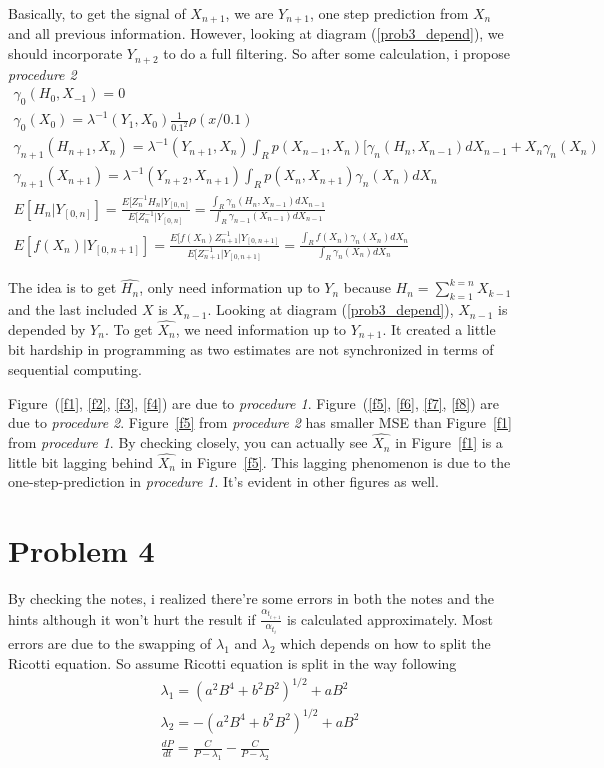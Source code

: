 \documentclass[a4paper,10pt]{article}
\begin{document}
Basically, to get the signal of $X_{n+1}$, we are $Y_{n+1}$, one step prediction from $X_n$ and all previous information. However, looking at diagram (\ref{prob3_depend}), we should incorporate $Y_{n+2}$ to do a full filtering. So after some calculation, i propose \emph{procedure 2}
\begin{eqnarray}
\gamma_0(H_0, X_{-1}) = 0  \\
\gamma_0(X_0) = \lambda^{-1}(Y_{1}, X_{0})\frac{1}{0.1^2}\rho(x/0.1)  \\
\gamma_{n+1}(H_{n+1}, X_{n}) =  \lambda^{-1}(Y_{n+1}, X_{n}) \int_R p(X_{n-1}, X_n)[\gamma_n(H_n, X_{n-1})dX_{n-1} + X_n \gamma_n(X_n)  \\
\gamma_{n+1}(X_{n+1}) = \lambda^{-1}(Y_{n+2}, X_{n+1}) \int_R p(X_n, X_{n+1}) \gamma_n(X_n)dX_n  \\
E[H_n|Y_{[0,n]}] = \frac{E[Z_n^{-1}H_n|Y_{[0,n]}}{E[Z_n^{-1}|Y_{[0,n]}} = \frac{\int_R \gamma_n(H_n, X_{n-1}) dX_{n-1}}{\int_R \gamma_{n-1}(X_{n-1})dX_{n-1}} \\
E[f(X_n) | Y_{[0,n+1]}] = \frac{E[f(X_n)Z_{n+1}^{-1}|Y_{[0,n+1]}}{E[Z_{n+1}^{-1}|Y_{[0,n+1]}} = \frac{\int_R f(X_n)\gamma_n(X_n)dX_n }{\int_R \gamma_n(X_n)dX_n}
\end{eqnarray}

The idea is to get $\hat{H_n}$, only need information up to $Y_n$ because $H_n = \sum_{k=1}^{k=n} X_{k-1}$ and the last included $X$ is $X_{n-1}$. Looking at diagram (\ref{prob3_depend}), $X_{n-1}$ is depended by $Y_n$. To get $\hat{X_n}$, we need information up to $Y_{n+1}$. It created a little bit hardship in programming as two estimates are not synchronized in terms of sequential computing.

Figure~(\ref{f1}, \ref{f2}, \ref{f3}, \ref{f4}) are due to \emph{procedure 1}. Figure~(\ref{f5}, \ref{f6}, \ref{f7}, \ref{f8}) are due to \emph{procedure 2}. Figure~\ref{f5} from \emph{procedure 2} has smaller MSE than Figure~\ref{f1} from \emph{procedure 1}. By checking closely, you can actually see $\hat{X_n}$ in Figure~\ref{f1} is a little bit lagging behind $\hat{X_n}$ in Figure~\ref{f5}. This lagging phenomenon is due to the one-step-prediction in \emph{procedure 1}. It's evident in other figures as well.

\section{Problem 4}
By checking the notes, i realized there're some errors in both the notes and the hints although it won't hurt the result if $\frac{\alpha_{t_{i+1}}}{\alpha_{t_i}}$ is calculated approximately. Most errors are due to the swapping of $\lambda_1$ and $\lambda_2$ which depends on how to split the Ricotti equation. So assume Ricotti equation is split in the way following
\begin{eqnarray}
\lambda_1 = {(a^2B^4+b^2B^2)}^{1/2}+aB^2 \\
\lambda_2 = -{(a^2B^4+b^2B^2)}^{1/2}+aB^2 \\
\frac{dP}{dt} = \frac{C}{P - \lambda_1} - \frac{C}{P-\lambda_2}
\end{eqnarray}
\end{document}
